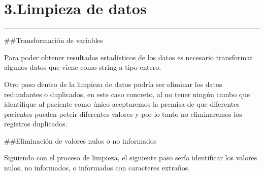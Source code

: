 \documentclass[
]{article}
\newenvironment{Shaded}{\begin{snugshade}}{\end{snugshade}}
\newcommand{\FunctionTok}[1]{\textcolor[rgb]{0.94,0.94,0.56}{#1}}
\newcommand{\NormalTok}[1]{\textcolor[rgb]{0.80,0.80,0.80}{#1}}
\newcommand{\OtherTok}[1]{\textcolor[rgb]{0.94,0.94,0.56}{#1}}
\newcommand{\SpecialCharTok}[1]{\textcolor[rgb]{0.86,0.64,0.64}{#1}}
\begin{document}
\hypertarget{limpieza-de-datos}{%
\section{3.Limpieza de datos}\label{limpieza-de-datos}}

\begin{center}\rule{0.5\linewidth}{0.5pt}\end{center}

\#\#Transformación de variables

Para poder obtener resultados estadísticos de los datos es necesario
transformar algunos datos que viene como string a tipo entero.

\begin{Shaded}
\end{Shaded}

Otro paso dentro de la limpieza de datos podría ser eliminar los datos
redundantes o duplicados, en este caso concreto, al no tener ningún
cambo que identifique al paciente como único aceptaremos la premisa de
que diferentes pacientes pueden peteir diferentes valores y por lo tanto
no eliminaremos los registros duplicados.

\#\#Eliminación de valores nulos o no informados

Siguiendo con el proceso de limpieza, el siguiente paso sería
identificar los valores nulos, no informados, o informados con
caracteres extraños.
\end{document}

